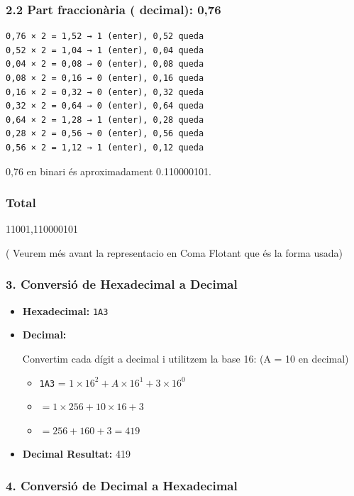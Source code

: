 \documentclass[
  12 pt,
  a4paper,
]{article}
\providecommand{\tightlist}{%
  \setlength{\itemsep}{0pt}\setlength{\parskip}{0pt}}
\begin{document}
\subsubsection{2.2 Part fraccionària ( decimal):
0,76}\label{part-fraccionuxe0ria-decimal-076}

\begin{verbatim}
0,76 × 2 = 1,52 → 1 (enter), 0,52 queda
0,52 × 2 = 1,04 → 1 (enter), 0,04 queda
0,04 × 2 = 0,08 → 0 (enter), 0,08 queda
0,08 × 2 = 0,16 → 0 (enter), 0,16 queda
0,16 × 2 = 0,32 → 0 (enter), 0,32 queda
0,32 × 2 = 0,64 → 0 (enter), 0,64 queda
0,64 × 2 = 1,28 → 1 (enter), 0,28 queda
0,28 × 2 = 0,56 → 0 (enter), 0,56 queda
0,56 × 2 = 1,12 → 1 (enter), 0,12 queda
\end{verbatim}

0,76 en binari és aproximadament 0.110000101.

\subsubsection{Total}\label{total}

11001,110000101

( Veurem més avant la representacio en Coma Flotant que és la forma
usada)

\subsubsection{3. Conversió de Hexadecimal a
Decimal}\label{conversiuxf3-de-hexadecimal-a-decimal}

\begin{itemize}
\item
  \textbf{Hexadecimal:} \texttt{1A3}
\item
  \textbf{Decimal:}

  Convertim cada dígit a decimal i utilitzem la base 16: (A = 10 en
  decimal)

  \begin{itemize}
  \tightlist
  \item
    \texttt{1A3} = \(1 \times 16^2 + A \times 16^1 + 3 \times 16^0\)
  \item
    \(= 1 \times 256 + 10 \times 16 + 3\)
  \item
    \(= 256 + 160 + 3 = 419\)
  \end{itemize}
\item
  \textbf{Decimal Resultat:} 419
\end{itemize}

\subsubsection{4. Conversió de Decimal a
Hexadecimal}\label{conversiuxf3-de-decimal-a-hexadecimal}
\end{document}
